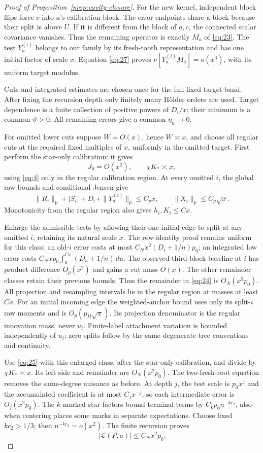 \begin{proof}[Proof of Proposition~\ref{prop:cavity-closure}]
For the new kernel, independent block
flips force \(c\) into \(a\)'s calibration
block. The error endpoints share a block
because their split is above \(U\).
If it is different from the block of
\(a,c\), the connected scalar covariance
vanishes. Thus the remaining operator is
exactly \(M_a\) of \eqref{eq:23}.
The test \(Y_a^{(i)}\) belongs to our family
by its fresh-tooth representation and
has one initial factor of scale \(x\).
Equation \eqref{eq:27} proves
\(\nu[Y_a^{(i)}M_a]=o(x^3)\), with its
uniform target modulus.

Cuts and integrated estimates are chosen
once for the full fixed target band.
After fixing the recursion depth only
finitely many H\"older orders are used.
Target dependence is a finite collection
of positive powers of \(D_i/x\); their
minimum is a common \(\vartheta>0\).
All remaining errors give a common
\(\eta_n\to0\).

For omitted lower cuts suppose \(W=O(x)\), hence
\(W\asymp x\), and choose all regular cuts at the
required fixed multiples of \(x\), uniformly in
the omitted target. First perform the star-only
calibration: it gives
\[
                 J_0=O(x^2),\qquad \chi K_*\asymp x,
\]
using \eqref{eq:4} only in the regular calibration
region. At every omitted \(i\), the global raw
bounds and conditional Jensen give
\[
 \|R_i\|_p+|S_i|+D_i+\|Y_a^{(i)}\|_p\le C_px,
                  \qquad \|X_i\|_p\le C_p\sqrt x .
\]
Monotonicity from the regular region also gives
\(h_i,K_i\le Cx\).

Enlarge the admissible tests by allowing their
one initial edge to split at any omitted \(i\),
retaining its natural scale \(x\). The row-identity
proof remains uniform for this class: an old-\(i\)
error costs at most \(C_Nx^2(D_i+1/n)p_0\);
an integrated low error costs
\(C_Nx p_0\int_0^{Cx}(D_u+1/n)\,du\).
The observed-third-block baseline at \(i\) has
product difference \(O_p(x^2)\) and gains a
cut mass \(O(x)\). The other remainder classes
retain their previous bounds. Thus the remainder
in \eqref{eq:24} is \(O_N(x^3p_0)\).
All projection and resampling intervals lie in
the regular region at masses at least \(Cx\).
For an initial incoming edge the weighted-anchor
bound uses only its split-\(i\) raw moments and
is \(O_p(p_H\sqrt x)\). Its projection denominator
is the regular innovation mass, never \(u_i\).
Finite-label attachment variation is bounded
independently of \(u_i\); zero splits follow
by the same degenerate-tree conventions and
continuity.

Use \eqref{eq:25} with this enlarged class,
after the star-only calibration, and divide
by \(\chi K_*\asymp x\). Its left side and
remainder are \(O_N(x^2p_0)\).
The two-fresh-root equation removes the
same-degree nuisance as before. At depth \(j\),
the test scale is \(p_0x^j\) and the accumulated
coefficient is at most \(C_jx^{-j}\), so
each intermediate error is \(O_j(x^2p_0)\).
The \(k\) marked star factors bound terminal
terms by \(C_kp_0n^{-kc_2}\), also when centering
places some marks in separate expectations.
Choose fixed \(kc_2>1/3\); then
\(n^{-kc_2}=o(x^2)\). The finite recursion proves
\[
                         |\mathcal L(P,a)|\le C_Nx^2p_0.
\]


\end{proof}
